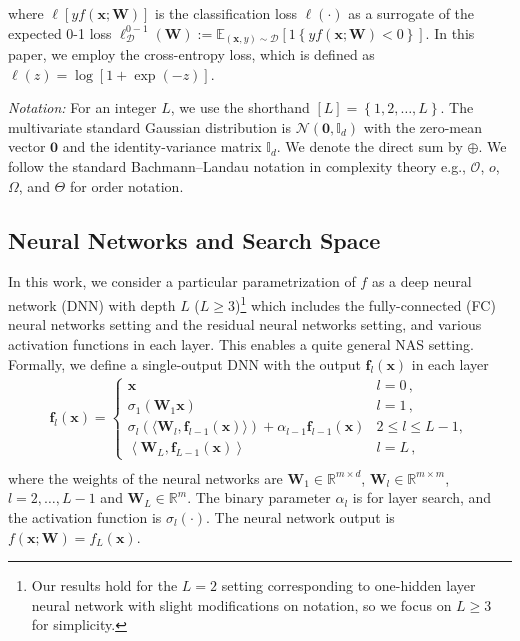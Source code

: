 \documentclass[nohyperref]{article}
\theoremstyle{plain}
\theoremstyle{definition}
\theoremstyle{remark}
\begin{document}
where $\ell [y f(\bm {x};\bm W)]$ is the classification loss $\ell(\cdot)$ as a surrogate of the expected 0-1 loss $\ell_{\mathcal{D} }^{0-1}(\bm W):=\mathbb{E}_{(\bm{x},y)\sim \mathcal{D} }[1\left \{ y f(\bm{x}; \bm W)<0 \right \} ]$. In this paper, we employ the cross-entropy loss, which is
defined as $\ell (z) = \log[1+\exp(-z)]$.


\emph{Notation:}  For an integer $L$, we use the shorthand $[L] = \left \{ 1,2,\dots ,L \right \}$. The multivariate standard Gaussian distribution is $\mathcal{N}(\bm 0, \mathbb{I}_d)$ with the zero-mean vector $\bm 0$ and the identity-variance matrix $\mathbb{I}_d$. We denote the direct sum by $\oplus$. We follow the standard Bachmann–Landau notation in complexity theory e.g., $\mathcal{O}$, $o$, $\Omega$, and $\Theta$ for order notation.

\subsection{Neural Networks and Search Space}
\label{ssec:search_space}

In this work, we consider a particular parametrization of $f$ as a deep neural network (DNN) with depth $L$ ($L \geq 3$)\footnote{Our results hold for the $L=2$ setting corresponding to one-hidden layer neural network with slight modifications on notation, so we focus on $L \geq 3$ for simplicity.} which includes the fully-connected (FC) neural networks setting and the residual neural networks setting, and various activation functions in each layer. This enables a quite general NAS setting.
Formally, we define a single-output DNN with the output $\bm{f}_l(\bm{x})$ in each layer
\begin{equation}
\begin{matrix}
\bm{f}_l(\bm{x}) \!=\! \left\{\begin{matrix}
\bm{x}  & l=0\,,\\
\sigma_1(\bm{W}_1 \bm{x})  & l=1\,,\\
\sigma_l(\langle \bm{W}_l, \bm{f}_{l-1}(\bm{x}) \rangle) \!+\! \alpha_{l-1}\bm{f}_{l-1}(\bm{x})  & 2\!\leq\! l \!\leq\! L\!-\!1, \\
\left \langle \bm{W}_L, \bm{f}_{L-1}(\bm{x}) \right \rangle & l=L\,,
\end{matrix}\right. \\
\end{matrix}
\label{eq:network}
\end{equation}
where the weights of the neural networks are $\bm{W}_1 \in \mathbb{R}^{m \times d} $, $\bm{W}_l \in \mathbb{R}^{m\times m} $, $l = 2,\dots ,L-1$ and $\bm{W}_L \in \mathbb{R}^{m}$. The binary parameter $\alpha_l$ is for layer search, and the activation function is $\sigma_{l}(\cdot)$. 
The neural network output is $f(\bm x; \bm W) = f_L(\bm x)$.
\end{document}

